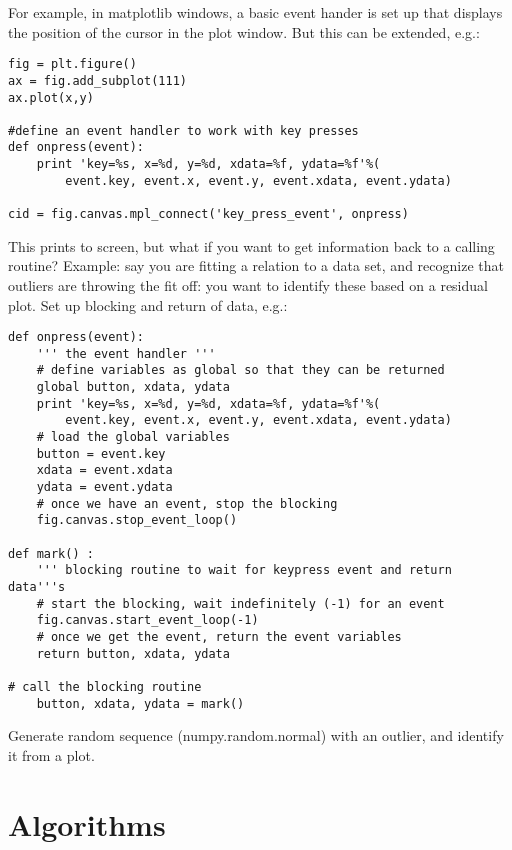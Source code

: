 \documentclass{article}
\begin{document}
For example, in matplotlib windows, a basic event hander is set up
that displays the position of the cursor in the plot window. But this
can be extended, e.g.:
\begin{verbatim}
fig = plt.figure()
ax = fig.add_subplot(111)
ax.plot(x,y)

#define an event handler to work with key presses
def onpress(event):
    print 'key=%s, x=%d, y=%d, xdata=%f, ydata=%f'%(
        event.key, event.x, event.y, event.xdata, event.ydata)

cid = fig.canvas.mpl_connect('key_press_event', onpress)
\end{verbatim}
This prints to screen, but what if you want to get information back to
a calling routine? Example: say you are fitting a relation to a data
set, and recognize that outliers are throwing the fit off: you want to
identify these based on a residual plot. Set up blocking and return of
data, e.g.:
\begin{verbatim}
def onpress(event):
    ''' the event handler '''
    # define variables as global so that they can be returned
    global button, xdata, ydata
    print 'key=%s, x=%d, y=%d, xdata=%f, ydata=%f'%(
        event.key, event.x, event.y, event.xdata, event.ydata)
    # load the global variables
    button = event.key
    xdata = event.xdata
    ydata = event.ydata
    # once we have an event, stop the blocking
    fig.canvas.stop_event_loop()

def mark() :
    ''' blocking routine to wait for keypress event and return data'''s
    # start the blocking, wait indefinitely (-1) for an event
    fig.canvas.start_event_loop(-1)
    # once we get the event, return the event variables
    return button, xdata, ydata

# call the blocking routine
    button, xdata, ydata = mark()
\end{verbatim}

Generate random sequence (numpy.random.normal) with an outlier, and
identify it from a plot.


\newpage
\section{Algorithms}
\end{document}
